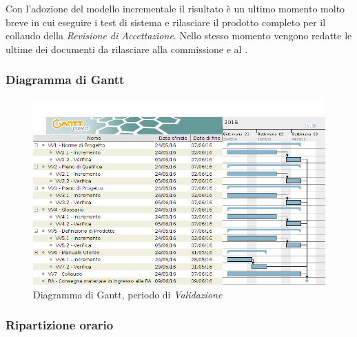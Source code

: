 Con l'adozione del modello incrementale il risultato \`e un ultimo momento molto breve in cui eseguire i test di sistema e rilasciare il prodotto completo per il collaudo della \textit{Revisione di Accettazione}. Nello stesso momento vengono redatte le ultime  dei documenti da rilasciare alla commissione e al .

\subsubsection{Diagramma di Gantt}
\begin{figure}[ht!]
  \includegraphics[width=1\textwidth]{res/img/pianificazione/VerificaEValidazione.png}
  \caption{Diagramma di Gantt, periodo di \textit{Validazione}}
\end{figure}

\subsubsection{Ripartizione orario}

